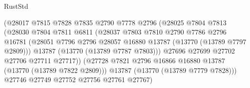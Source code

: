 \begin{lexlean}{RustStd}
\begin{coremodule}
                                      (@28017
                                        @7815
                                        @7828
                                        @7835
                                        @2790
                                        @7778
                                        @2796
                                        (@28025
                                          @7804
                                          @7813
                                          (@28030
                                            @7804
                                            @7811
                                            @6811
                                            (@28037
                                              @7803
                                              @7810
                                              @2790
                                              @7786
                                              @2796
                                              @16781
                                              (@28051
                                                @7796
                                                @2796
                                                @28057
                                                @16880
                                                @13787
                                                (@13770 (@13789 @7797 @2809)))
                                              @13787
                                              (@13770 (@13789 @7787 @7803)))
                                            @27696
                                            @27699
                                            @27702
                                            @27706
                                            @27711
                                            @27717))
                                        (@27728
                                          @7821
                                          @2796
                                          @16866
                                          @16880
                                          @13787
                                          (@13770 (@13789 @7822 @2809)))
                                        @13787
                                        (@13770 (@13789 @7779 @7828)))
                                      @27746
                                      @27749
                                      @27752
                                      @27756
                                      @27761
                                      @27767)

\end{coremodule}
\end{lexlean}
